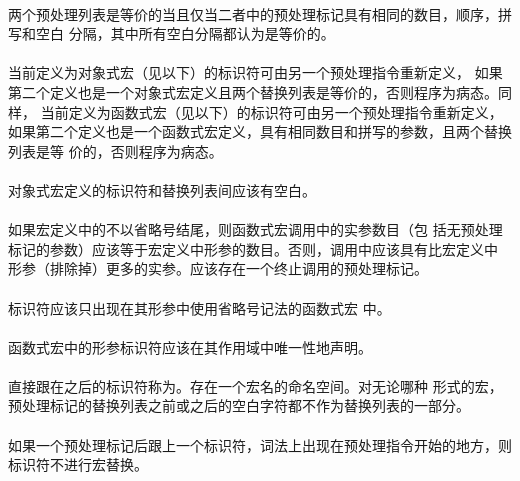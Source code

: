 \paragraph{}
两个预处理列表是等价的当且仅当二者中的预处理标记具有相同的数目，顺序，拼写和空白
分隔，其中所有空白分隔都认为是等价的。

\paragraph{}
当前定义为对象式宏（见以下）的标识符可由另一个预处理指令重新定义，
如果第二个定义也是一个对象式宏定义且两个替换列表是等价的，否则程序为病态。同样，
当前定义为函数式宏（见以下）的标识符可由另一个预处理指令重新定义，
如果第二个定义也是一个函数式宏定义，具有相同数目和拼写的参数，且两个替换列表是等
价的，否则程序为病态。

\paragraph{}
对象式宏定义的标识符和替换列表间应该有空白。

\paragraph{}
如果宏定义中的不以省略号结尾，则函数式宏调用中的实参数目（包
括无预处理标记的参数）应该等于宏定义中形参的数目。否则，调用中应该具有比宏定义中
形参（排除掉）更多的实参。应该存在一个终止调用的\tm{)}预处理标记。

\paragraph{}
标识符应该只出现在其形参中使用省略号记法的函数式宏
中。

\paragraph{}
函数式宏中的形参标识符应该在其作用域中唯一性地声明。

\paragraph{}
直接跟在之后的标识符称为。存在一个宏名的命名空间。对无论哪种
形式的宏，预处理标记的替换列表之前或之后的空白字符都不作为替换列表的一部分。

\paragraph{}
如果一个\tm{\#}预处理标记后跟上一个标识符，词法上出现在预处理指令开始的地方，则
标识符不进行宏替换。

